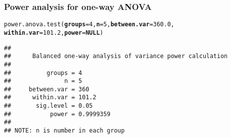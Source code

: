 \documentclass[color=usenames,dvipsnames]{beamer}\usepackage[]{graphicx}\usepackage[]{color}
\makeatletter
\newcommand{\hlnum}[1]{\textcolor[rgb]{0.69,0.494,0}{#1}}%
\newcommand{\hlstd}[1]{\textcolor[rgb]{0,0,0}{#1}}%
\newcommand{\hlkwa}[1]{\textcolor[rgb]{0,0,0}{\textbf{#1}}}%
\newcommand{\hlkwc}[1]{\textcolor[rgb]{0,0,0}{\textbf{#1}}}%
\newcommand{\hlkwd}[1]{\textcolor[rgb]{0.004,0.004,0.506}{#1}}%
\newenvironment{kframe}{%
 \def\at@end@of@kframe{}%
 \ifinner\ifhmode%
  \def\at@end@of@kframe{\end{minipage}}%
  \begin{minipage}{\columnwidth}%
 \fi\fi%
 \def\FrameCommand##1{\hskip\@totalleftmargin \hskip-\fboxsep
 \colorbox{shadecolor}{##1}\hskip-\fboxsep
     \hskip-\linewidth \hskip-\@totalleftmargin \hskip\columnwidth}%
 \MakeFramed {\advance\hsize-\width
   \@totalleftmargin\z@ \linewidth\hsize
   \@setminipage}}%
 {\par\unskip\endMakeFramed%
 \at@end@of@kframe}
\newenvironment{knitrout}{}{} %
\newcommand{\inr}[1]{\colorbox{inlinecolor}{\texttt{#1}}}
\makeatother
\begin{document}
\begin{frame}[fragile]
  \frametitle{Power analysis for one-way ANOVA}
\begin{small}
\begin{knitrout}
\color{fgcolor}\begin{kframe}
\begin{alltt}
\hlkwd{power.anova.test}\hlstd{(}\hlkwc{groups}\hlstd{=}\hlnum{4}\hlstd{,} \hlkwc{n}\hlstd{=}\hlnum{5}\hlstd{,} \hlkwc{between.var}\hlstd{=}\hlnum{360.0}\hlstd{,}
                 \hlkwc{within.var}\hlstd{=}\hlnum{101.2}\hlstd{,} \hlkwc{power}\hlstd{=}\hlkwa{NULL}\hlstd{)}
\end{alltt}
\begin{verbatim}
## 
##      Balanced one-way analysis of variance power calculation 
## 
##          groups = 4
##               n = 5
##     between.var = 360
##      within.var = 101.2
##       sig.level = 0.05
##           power = 0.9999359
## 
## NOTE: n is number in each group
\end{verbatim}
\end{kframe}
\end{knitrout}
\end{small}
\end{frame}










\end{document}
